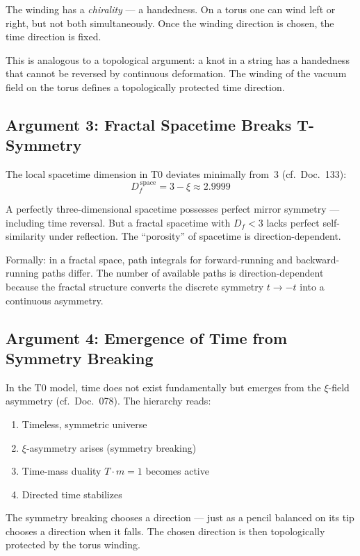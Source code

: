 The winding has a \emph{chirality} --- a handedness. On a torus one can wind left or right, but not both simultaneously. Once the winding direction is chosen, the time direction is fixed.

This is analogous to a topological argument: a knot in a string has a handedness that cannot be reversed by continuous deformation. The winding of the vacuum field on the torus defines a topologically protected time direction.

\subsection{Argument 3: Fractal Spacetime Breaks T-Symmetry}

The local spacetime dimension in T0 deviates minimally from~3 (cf.\ Doc.~133):
\begin{equation}
	D_f^{\,\text{space}} = 3 - \xi \approx 2.9999
\end{equation}

A perfectly three-dimensional spacetime possesses perfect mirror symmetry --- including time reversal. But a fractal spacetime with $D_f < 3$ lacks perfect self-similarity under reflection. The ``porosity'' of spacetime is direction-dependent.

Formally: in a fractal space, path integrals for forward-running and backward-running paths differ. The number of available paths is direction-dependent because the fractal structure converts the discrete symmetry $t \to -t$ into a continuous asymmetry.

\subsection{Argument 4: Emergence of Time from Symmetry Breaking}

In the T0 model, time does not exist fundamentally but emerges from the $\xi$-field asymmetry (cf.\ Doc.~078). The hierarchy reads:
\begin{enumerate}
	\item Timeless, symmetric universe
	\item $\xi$-asymmetry arises (symmetry breaking)
	\item Time-mass duality $T \cdot m = 1$ becomes active
	\item Directed time stabilizes
\end{enumerate}

The symmetry breaking chooses a direction --- just as a pencil balanced on its tip chooses a direction when it falls. The chosen direction is then topologically protected by the torus winding.

